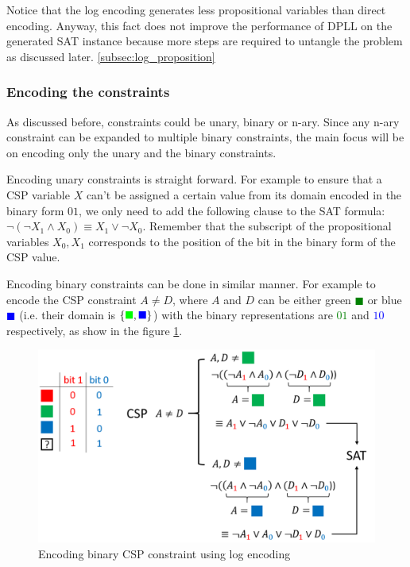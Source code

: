 Notice that the log encoding generates less propositional variables than direct encoding. Anyway, this fact does not improve the performance of DPLL on the generated SAT instance because more steps are required to untangle the problem as discussed later. \ref{subsec:log_proposition}

\subsubsection{Encoding the constraints}
As discussed before, constraints could be unary, binary or n-ary. Since any n-ary constraint can be expanded to multiple binary constraints, the main focus will be on encoding only the unary and the binary constraints.

Encoding unary constraints is straight forward. For example to ensure that a CSP variable $X$ can't be assigned a certain value from its domain encoded in the binary form $01$, we only need to add the following clause to the SAT formula: $\neg (\neg X_1 \wedge X_0) \equiv X_1 \vee \neg X_0$. Remember that the subscript of the propositional variables $X_0, X_1$ corresponds to the position of the bit in the binary form of the CSP value.

Encoding binary constraints can be done in similar manner. For example to encode the CSP constraint $A \neq D$, where $A$ and $D$ can be either green \textcolor{green}{$\blacksquare$} or blue \textcolor{blue}{$\blacksquare$} (i.e. their domain is $\{ \textcolor{green}{\blacksquare}, \textcolor{blue}{\blacksquare} \}$) with the binary representations are \textcolor{green}{$01$} and \textcolor{blue}{$10$} respectively, as show in the figure \ref{fig:binary_constraints_log_encoding}.
\begin{figure}[H]
	\centering
	\includegraphics[width=0.7\linewidth]{assets/binary_constraints_log_encoding}
	\captionsetup{justification=centering,margin=2cm}
	\caption{Encoding binary CSP constraint using log encoding}
	\label{fig:binary_constraints_log_encoding}
\end{figure}

